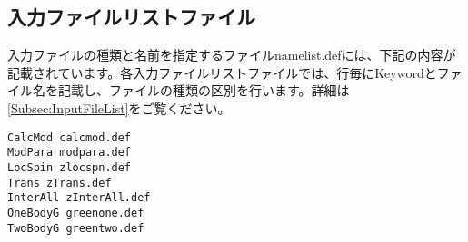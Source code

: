 \subsection{入力ファイルリストファイル}
入力ファイルの種類と名前を指定するファイルnamelist.defには、下記の内容が記載されています。各入力ファイルリストファイルでは、行毎にKeywordとファイル名を記載し、ファイルの種類の区別を行います。詳細は\ref{Subsec:InputFileList}をご覧ください。
\\
\begin{minipage}{15cm}
\begin{screen}
\begin{verbatim}
CalcMod calcmod.def
ModPara modpara.def
LocSpin zlocspn.def
Trans zTrans.def
InterAll zInterAll.def
OneBodyG greenone.def
TwoBodyG greentwo.def
\end{verbatim}
\end{screen}
\end{minipage}


